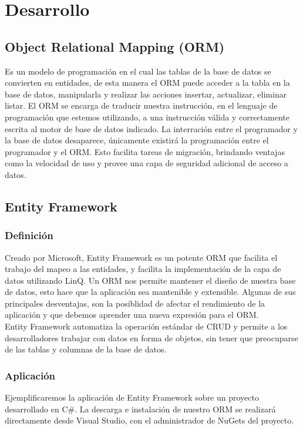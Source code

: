 \documentclass{article}
\begin{document}
\section{Desarrollo}
\subsection{Object Relational Mapping (ORM)}
Es un modelo de programación en el cual las tablas de la base de datos se convierten en entidades, de esta manera el ORM puede acceder a la tabla en la base de datos, manipularla y realizar las acciones insertar, actualizar, eliminar listar. El ORM se encarga de traducir nuestra instrucción, en el lenguaje de programación que estemos utilizando, a una instrucción válida y correctamente escrita al motor de base de datos indicado. La interración entre el programador y la base de datos desaparece, únicamente existirá la programación entre el programador y el ORM. Esto facilita tareas de migración, brindando ventajas como la velocidad de uso y provee una capa de seguridad adicional de acceso a datos.

\subsection{Entity Framework}
\subsubsection{Definición}
Creado por Microsoft, Entity Framework es un potente ORM que facilita el trabajo del mapeo a las entidades, y facilita la implementación de la capa de datos utilizando LinQ. Un ORM nos permite mantener el diseño de nuestra base de datos, esto hace que la aplicación sea mantenible y extensible. Algunas de sus principales desventajas, son la posiblidad de afectar el rendimiento de la aplicación y que debemos aprender una nueva expresión para el ORM.\\Entity Framework automatiza la operación estándar de CRUD y permite a los desarrolladores trabajar con datos en forma de objetos, sin tener que preocuparse de las tablas y columnas de la base de datos.
\subsubsection{Aplicación}
Ejemplificaremos la aplicación de Entity Framework sobre un proyecto desarrollado en C#. La descarga e instalación de nuestro ORM se realizará directamente desde Visual Studio, con el administrador de NuGets del proyecto.
\end{document}
